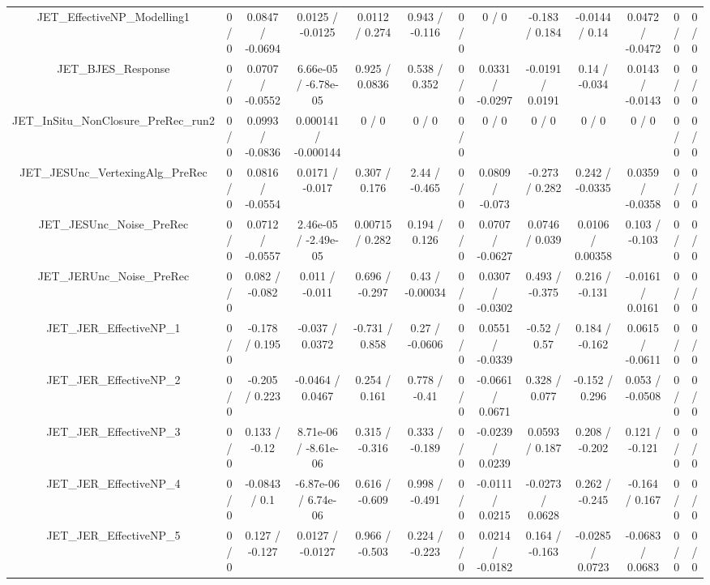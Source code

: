 \documentclass[10pt]{article}
\begin{document}
\begin{table}[htbp]
\begin{center}
\begin{tabular}{|c|c|c|c|c|c|c|c|c|c|c|c|c|}
  JET_EffectiveNP_Modelling1 & 0 / 0 & 0.0847 / -0.0694 & 0.0125 / -0.0125 & 0.0112 / 0.274 & 0.943 / -0.116 & 0 / 0 & 0 / 0 & -0.183 / 0.184 & -0.0144 / 0.14 & 0.0472 / -0.0472 & 0 / 0 & 0 / 0 \\ 
  JET_BJES_Response & 0 / 0 & 0.0707 / -0.0552 & 6.66e-05 / -6.78e-05 & 0.925 / 0.0836 & 0.538 / 0.352 & 0 / 0 & 0.0331 / -0.0297 & -0.0191 / 0.0191 & 0.14 / -0.034 & 0.0143 / -0.0143 & 0 / 0 & 0 / 0 \\ 
  JET_InSitu_NonClosure_PreRec_run2 & 0 / 0 & 0.0993 / -0.0836 & 0.000141 / -0.000144 & 0 / 0 & 0 / 0 & 0 / 0 & 0 / 0 & 0 / 0 & 0 / 0 & 0 / 0 & 0 / 0 & 0 / 0 \\ 
  JET_JESUnc_VertexingAlg_PreRec & 0 / 0 & 0.0816 / -0.0554 & 0.0171 / -0.017 & 0.307 / 0.176 & 2.44 / -0.465 & 0 / 0 & 0.0809 / -0.073 & -0.273 / 0.282 & 0.242 / -0.0335 & 0.0359 / -0.0358 & 0 / 0 & 0 / 0 \\ 
  JET_JESUnc_Noise_PreRec & 0 / 0 & 0.0712 / -0.0557 & 2.46e-05 / -2.49e-05 & 0.00715 / 0.282 & 0.194 / 0.126 & 0 / 0 & 0.0707 / -0.0627 & 0.0746 / 0.039 & 0.0106 / 0.00358 & 0.103 / -0.103 & 0 / 0 & 0 / 0 \\ 
  JET_JERUnc_Noise_PreRec & 0 / 0 & 0.082 / -0.082 & 0.011 / -0.011 & 0.696 / -0.297 & 0.43 / -0.00034 & 0 / 0 & 0.0307 / -0.0302 & 0.493 / -0.375 & 0.216 / -0.131 & -0.0161 / 0.0161 & 0 / 0 & 0 / 0 \\ 
  JET_JER_EffectiveNP_1 & 0 / 0 & -0.178 / 0.195 & -0.037 / 0.0372 & -0.731 / 0.858 & 0.27 / -0.0606 & 0 / 0 & 0.0551 / -0.0339 & -0.52 / 0.57 & 0.184 / -0.162 & 0.0615 / -0.0611 & 0 / 0 & 0 / 0 \\ 
  JET_JER_EffectiveNP_2 & 0 / 0 & -0.205 / 0.223 & -0.0464 / 0.0467 & 0.254 / 0.161 & 0.778 / -0.41 & 0 / 0 & -0.0661 / 0.0671 & 0.328 / 0.077 & -0.152 / 0.296 & 0.053 / -0.0508 & 0 / 0 & 0 / 0 \\ 
  JET_JER_EffectiveNP_3 & 0 / 0 & 0.133 / -0.12 & 8.71e-06 / -8.61e-06 & 0.315 / -0.316 & 0.333 / -0.189 & 0 / 0 & -0.0239 / 0.0239 & 0.0593 / 0.187 & 0.208 / -0.202 & 0.121 / -0.121 & 0 / 0 & 0 / 0 \\ 
  JET_JER_EffectiveNP_4 & 0 / 0 & -0.0843 / 0.1 & -6.87e-06 / 6.74e-06 & 0.616 / -0.609 & 0.998 / -0.491 & 0 / 0 & -0.0111 / 0.0215 & -0.0273 / 0.0628 & 0.262 / -0.245 & -0.164 / 0.167 & 0 / 0 & 0 / 0 \\ 
  JET_JER_EffectiveNP_5 & 0 / 0 & 0.127 / -0.127 & 0.0127 / -0.0127 & 0.966 / -0.503 & 0.224 / -0.223 & 0 / 0 & 0.0214 / -0.0182 & 0.164 / -0.163 & -0.0285 / 0.0723 & -0.0683 / 0.0683 & 0 / 0 & 0 / 0 \\ 

\end{tabular}
\end{center}
\end{table}
\end{document}
